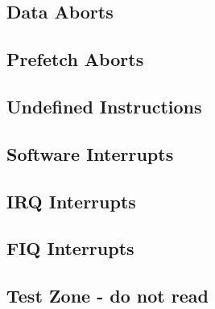 \documentclass[a4paper,10pt,twoside]{article}
\begin{document}
\subsection{Data Aborts}

\subsection{Prefetch Aborts}

\subsection{Undefined Instructions}

\subsection{Software Interrupts}

\subsection{IRQ Interrupts}

\subsection{FIQ Interrupts}


\subsection{Test Zone - do not read}
\cite{ARMARM}



\end{document}

